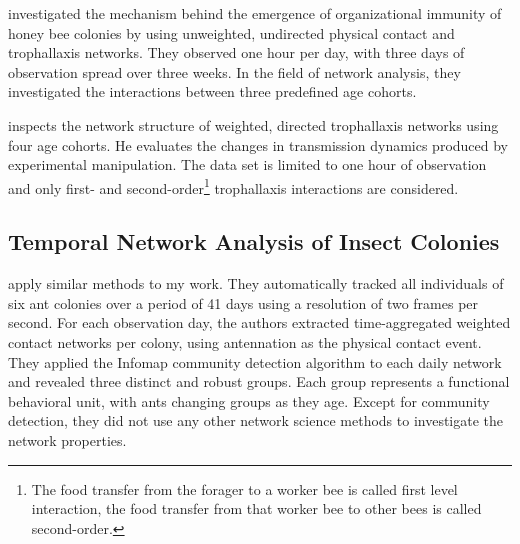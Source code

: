 
\textcite{scholl2011olfactory} investigated the mechanism behind the emergence of organizational immunity of honey bee colonies by using unweighted, undirected physical contact and trophallaxis networks.
They observed one hour per day, with three days of observation spread over three weeks.
In the field of network analysis, they investigated the interactions between three predefined age cohorts.


\textcite{naug2008structure} inspects the network structure of weighted, directed trophallaxis networks using four age cohorts.
He evaluates the changes in transmission dynamics produced by experimental manipulation.
The data set is limited to one hour of observation and only first- and second-order\footnote{The food transfer from the forager to a worker bee is called first level interaction, the food transfer from that worker bee to other bees is called second-order.} trophallaxis interactions are considered.


\subsection{Temporal Network Analysis of Insect Colonies}

\textcite{mersch2013tracking} apply similar methods to my work.
They automatically tracked all individuals of six ant colonies over a period of 41 days using a resolution of two frames per second.
For each observation day, the authors extracted time-aggregated weighted contact networks per colony, using antennation as the physical contact event.
They applied the Infomap community detection algorithm to each daily network and revealed three distinct and robust groups.
Each group represents a functional behavioral unit, with ants changing groups as they age.
Except for community detection, they did not use any other network science methods to investigate the network properties.


